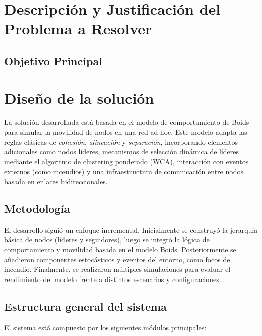 \documentclass{article}
\begin{document}
\section{Descripción y Justificación del Problema a Resolver}\label{sec:descr}


\subsection{Objetivo Principal}




\section{Diseño de la solución}

La solución desarrollada está basada en el modelo de comportamiento de Boids para simular la movilidad de nodos en una red ad hoc. Este modelo adapta las reglas clásicas de \textit{cohesión}, \textit{alineación} y \textit{separación}, incorporando elementos adicionales como nodos líderes, mecanismos de selección dinámica de líderes mediante el algoritmo de clustering ponderado (WCA), interacción con eventos externos (como incendios) y una infraestructura de comunicación entre nodos basada en enlaces bidireccionales.

\subsection{Metodología}

El desarrollo siguió un enfoque incremental. Inicialmente se construyó la jerarquía básica de nodos (líderes y seguidores), luego se integró la lógica de comportamiento y movilidad basada en el modelo Boids. Posteriormente se añadieron componentes estocásticos y eventos del entorno, como focos de incendio. Finalmente, se realizaron múltiples simulaciones para evaluar el rendimiento del modelo frente a distintos escenarios y configuraciones.

\subsection{Estructura general del sistema}

El sistema está compuesto por los siguientes módulos principales:
\end{document}
